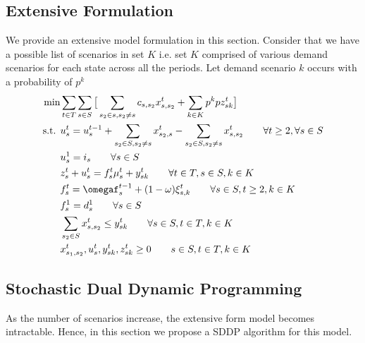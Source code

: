 \documentclass[11pt,letterpaper]{article}
\begin{document}
\subsection{Extensive Formulation}
We provide an extensive model formulation in this section. Consider that we have a possible list of scenarios in set $K$ i.e. set $K$ comprised of various demand scenarios for each state across all the periods. Let demand scenario $k$ occurs with a probability of $p^k$
\begin{align*}
    \min & \sum_{t\in T}\sum_{s\in S}\big[\sum_{s_2 \in s, s_2\neq s} c_{s,s_2}x^t_{s,s_2}+\sum_{k\in K} p^kpz^t_{sk}\big]\\
    \text{s.t. } & u_s^t=u_s^{t-1}+\sum_{s_2\in S,s_2\neq s}x^t_{s_2,s}-\sum_{s_2\in S, s_2\neq s}x^t_{s,s_2} \qquad \forall t\ge 2, \forall s \in S\\
    & u_s^1=i_s \qquad \forall s\in S\\
    & z^t_s+u^t_s=f^t_s\mu^t_s+y^t_{sk} \qquad \forall t \in T,s \in S, k\in K\\
    &f^t_s=\omegaf^{t-1}_s+(1-\omega)\xi^t_{s,k} \qquad \forall s\in S, t\ge 2,k\in K \\
    &f^1_s=d^1_s \qquad \forall s\in S\\
    & \sum_{s_2\in S}x^t_{s,s_2}\le y^t_{sk} \qquad \forall s \in S, t\in T, k\in K\\
    & x^t_{s_1,s_2}, u^t_s,y^t_{sk},z^t_{sk} \geq 0 \qquad s\in S, t\in T,k \in K
\end{align*}
\subsection{Stochastic Dual Dynamic Programming}
As the number of scenarios increase, the extensive form model becomes intractable. Hence, in this section we propose a SDDP algorithm for this model.
\end{document}
